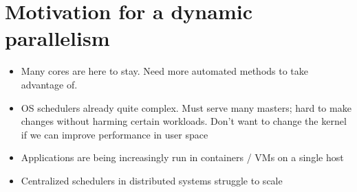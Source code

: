 \section{Motivation for a dynamic parallelism}
\begin{itemize}
  \item Many cores are here to stay. Need more automated methods to take advantage of. \cite{baumann2009multikernel}
  \item OS schedulers already quite complex. Must serve many masters; hard to make changes without harming certain workloads. Don't want to change the kernel if we can improve performance in user space \cite{lozi2016linux}
  \item Applications are being increasingly run in containers / VMs on a single host
  \item Centralized schedulers in distributed systems struggle to scale \cite{ousterhout2013sparrow}
\end{itemize}
